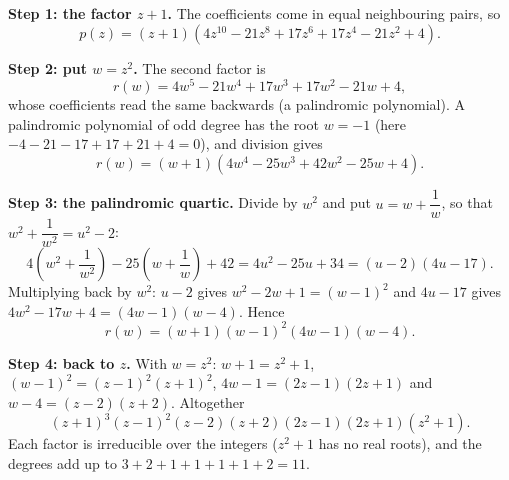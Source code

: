 \textbf{Step 1: the factor $z+1$.} The coefficients come in equal neighbouring pairs, so
\[p(z)=(z+1)\left(4z^{10}-21z^8+17z^6+17z^4-21z^2+4\right).\]

\textbf{Step 2: put $w=z^2$.} The second factor is
\[r(w)=4w^5-21w^4+17w^3+17w^2-21w+4,\]
whose coefficients read the same backwards (a palindromic polynomial). A palindromic polynomial of odd degree has the root $w=-1$ (here $-4-21-17+17+21+4=0$), and division gives
\[r(w)=(w+1)\left(4w^4-25w^3+42w^2-25w+4\right).\]

\textbf{Step 3: the palindromic quartic.} Divide by $w^2$ and put $u=w+\dfrac{1}{w}$, so that $w^2+\dfrac{1}{w^2}=u^2-2$:
\[4\left(w^2+\dfrac{1}{w^2}\right)-25\left(w+\dfrac{1}{w}\right)+42=4u^2-25u+34=(u-2)(4u-17).\]
Multiplying back by $w^2$: $u-2$ gives $w^2-2w+1=(w-1)^2$ and $4u-17$ gives $4w^2-17w+4=(4w-1)(w-4)$. Hence
\[r(w)=(w+1)(w-1)^2(4w-1)(w-4).\]

\textbf{Step 4: back to $z$.} With $w=z^2$: $w+1=z^2+1$, $(w-1)^2=(z-1)^2(z+1)^2$, $4w-1=(2z-1)(2z+1)$ and $w-4=(z-2)(z+2)$. Altogether
\[\boxed{(z+1)^3(z-1)^2(z-2)(z+2)(2z-1)(2z+1)\left(z^2+1\right)}.\]
Each factor is irreducible over the integers ($z^2+1$ has no real roots), and the degrees add up to $3+2+1+1+1+1+2=11$.
